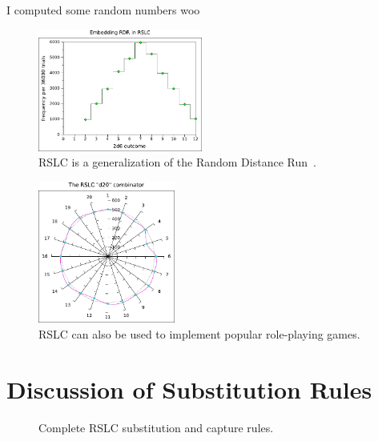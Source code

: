 \documentclass[10pt]{sigplanconf}
\begin{document}
I computed some random numbers woo

\begin{figure}[t]
	\begin{center}
	\includegraphics[width=0.48\textwidth]{rslc-rdr.pdf}
	\end{center}
	\caption{RSLC is a generalization of the Random Distance Run~\cite{rdr}.}
	\label{fig:rdr}
\end{figure}

\begin{figure}[t]
	\begin{center}
	\includegraphics[width=0.40\textwidth]{rslc-d20.pdf}
	\end{center}
	\caption{RSLC can also be used to implement popular role-playing games.}
	\label{fig:d20}
\end{figure}




\appendix

\section{Discussion of Substitution Rules}
\begin{figure}[t]
	\TypeRules{
		\SubstLamCapture \qquad \SubstLam \qquad
		\SubstApp \\
		\SubstVarX \qquad \SubstVarY \\
		\SubstCaseCapture \\ \SubstCase \\
		\SubstZero \qquad \SubstSuc \\
		\SubstLetCapture \qquad \SubstLet
	}
	\TypeRules{
		\CaptureLam \qquad \CaptureApp \qquad
		\CaptureVarX \qquad \CaptureVarY \\
		\CaptureCase \\
		\CaptureZero \qquad \CaptureSuc \qquad \CaptureLet
	}
	\caption{Complete RSLC substitution and capture rules.}
	\label{fig:subst-complete}
\end{figure}
\end{document}
